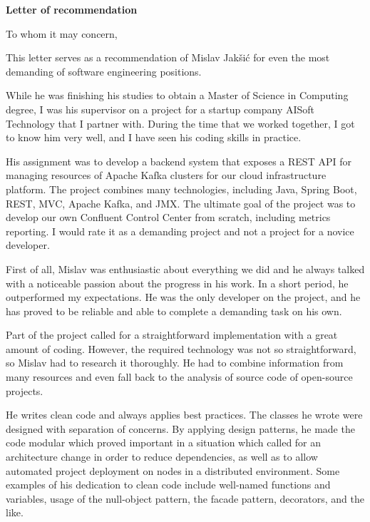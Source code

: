 \documentclass{letter}
\begin{document}
\begin{letter}{}

\begin{center}
{\bf {\large Letter of recommendation}}
\end{center}

\opening{To whom it may concern,}

This letter serves as a recommendation of Mislav Jakšić for even the most demanding of software engineering positions.

While he was finishing his studies to obtain a Master of Science in Computing degree, I was his supervisor on a project for a startup company AISoft Technology that I partner with. During the time that we worked together, I got to know him very well, and I have seen his coding skills in practice.

His assignment was to develop a backend system that exposes a REST API for managing resources of Apache Kafka clusters for our cloud infrastructure platform. The project combines many technologies, including Java, Spring Boot, REST, MVC, Apache Kafka, and JMX. The ultimate goal of the project was to develop our own Confluent Control Center from scratch, including metrics reporting. I would rate it as a demanding project and not a project for a novice developer. 

First of all, Mislav was enthusiastic about everything we did and he always talked with a noticeable passion about the progress in his work. In a short period, he outperformed my expectations. He was the only developer on the project, and he has proved to be reliable and able to complete a demanding task on his own.

Part of the project called for a straightforward implementation with a great amount of coding. However, the required technology was not so straightforward, so Mislav had to research it thoroughly. He had to combine information from many resources and even fall back to the analysis of source code of open-source projects.

He writes clean code and always applies best practices. The classes he wrote were designed with separation of concerns. By applying design patterns, he made the code modular which proved important in a situation which called for an architecture change in order to reduce dependencies, as well as to allow automated project deployment on nodes in a distributed environment. Some examples of his dedication to clean code include well-named functions and variables, usage of the null-object pattern, the facade pattern, decorators, and the like.


\end{letter}
\end{document}
